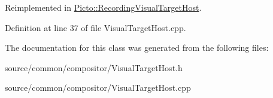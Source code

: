 Reimplemented in \hyperlink{class_picto_1_1_recording_visual_target_host_ac636397e7740a51ad0ef9ffc3a899333}{Picto\-::\-Recording\-Visual\-Target\-Host}.



Definition at line 37 of file Visual\-Target\-Host.\-cpp.



The documentation for this class was generated from the following files\-:\begin{DoxyCompactItemize}
\item 
source/common/compositor/Visual\-Target\-Host.\-h\item 
source/common/compositor/Visual\-Target\-Host.\-cpp\end{DoxyCompactItemize}
